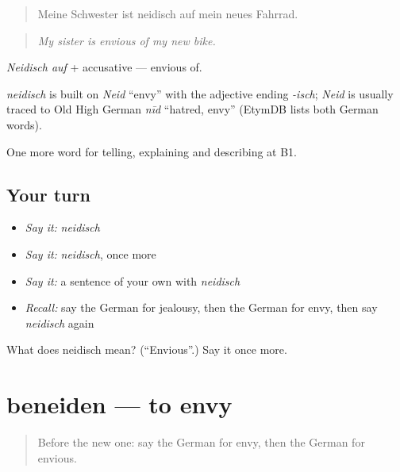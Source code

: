 \begin{quote}
Meine Schwester ist neidisch auf mein neues Fahrrad.
\end{quote}

\begin{quote}
\emph{My sister is envious of my new bike.}
\end{quote}

\emph{Neidisch auf} + accusative — envious of.

\begin{cousinweb}
\emph{neidisch} is built on \emph{Neid} \textquotedblleft{}envy\textquotedblright{} with the adjective ending \emph{-isch}; \emph{Neid} is usually traced to Old High German \emph{nīd} \textquotedblleft{}hatred, envy\textquotedblright{} (EtymDB lists both German words).
\end{cousinweb}

\begin{grammarlens}[title={What you've built}]
One more word for telling, explaining and describing at B1.
\end{grammarlens}

\subsection*{Your turn}
\begin{itemize}
\raggedright
  \item \emph{Say it:} \emph{neidisch}
  \item \emph{Say it:} \emph{neidisch}, once more
  \item \emph{Say it:} a sentence of your own with \emph{neidisch}
  \item \emph{Recall:} say the German for jealousy, then the German for envy, then say \emph{neidisch} again
\end{itemize}

\begin{tcolorbox}[breakable,colback=teal!4,colframe=teal!35!black,title={Before you move on}]
What does neidisch mean? (\textquotedblleft{}Envious\textquotedblright{}.) Say it once more.
\end{tcolorbox}
\section[beneiden]{beneiden — to envy}

\label{lesson:GE-C466-beneiden}



\begin{quote}
Before the new one: say the German for envy, then the German for envious.
\end{quote}

